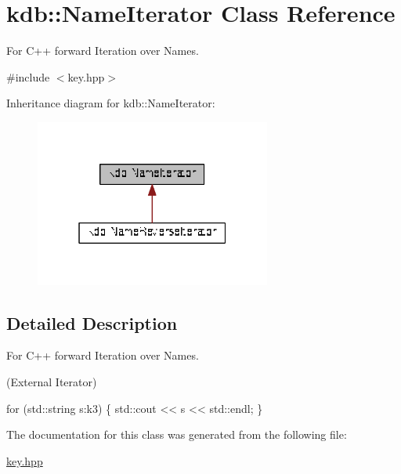 \hypertarget{classkdb_1_1NameIterator}{\section{kdb\+:\+:Name\+Iterator Class Reference}
\label{classkdb_1_1NameIterator}
}


For C++ forward Iteration over Names.  




{\ttfamily \#include $<$key.\+hpp$>$}



Inheritance diagram for kdb\+:\+:Name\+Iterator\+:
\nopagebreak
\begin{figure}[H]
\begin{center}
\leavevmode
\includegraphics[width=220pt]{classkdb_1_1NameIterator__inherit__graph}
\end{center}
\end{figure}


\subsection{Detailed Description}
For C++ forward Iteration over Names. 

(External Iterator) 
\begin{DoxyCode}
\textcolor{keywordflow}{for} (std::string s:k3)
\{
   std::cout << s << std::endl;
\}
\end{DoxyCode}
 

The documentation for this class was generated from the following file\+:\begin{DoxyCompactItemize}
\item 
\hyperlink{key_8hpp}{key.\+hpp}\end{DoxyCompactItemize}

